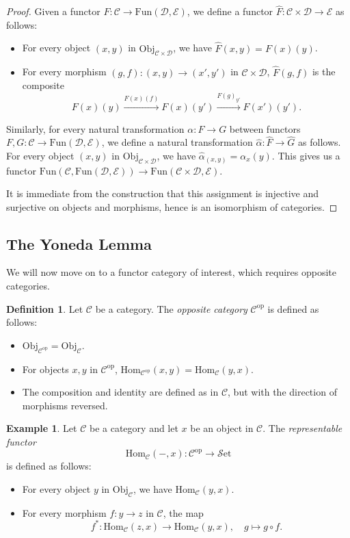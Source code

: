 \documentclass[11pt, a4paper]{amsart}
\newcommand{\cC}{\mathcal{C}}
\newcommand{\cD}{\mathcal{D}}
\newcommand{\cE}{\mathcal{E}}
\newcommand{\Hom}{\mathrm{Hom}}
\newcommand{\op}{\mathrm{op}}
\newcommand{\Fun}{\mathrm{Fun}}
\newcommand{\Set}{\mathscr{S}\mathrm{et}}
\newcommand{\Obj}{\mathrm{Obj}}
\theoremstyle{definition}
\newtheorem{definition}[equation]{Definition}
\newtheorem{example}[equation]{Example}
\theoremstyle{remark}
\numberwithin{equation}{section}
\begin{document}
\begin{proof}
 Given a functor $F\colon \cC \to \Fun(\cD,\cE)$, we define a functor $\hat{F}\colon \cC \times \cD \to \cE$ as follows:
\begin{itemize}[leftmargin=*]
  \item For every object $(x,y)$ in $\Obj_{\cC \times \cD}$, we have $\hat{F}(x,y) = F(x)(y)$.
  \item For every morphism $(g,f)\colon (x,y) \to (x',y')$ in $\cC \times \cD$, $\hat{F}(g,f)$ is the composite
  \[
    F(x)(y) \xrightarrow{F(x)(f)} F(x)(y') \xrightarrow{F(g)_{y'}} F(x')(y').
  \]
\end{itemize}
Similarly, for every natural transformation $\alpha\colon F \to G$ between functors $F,G\colon \cC \to \Fun(\cD,\cE)$, we define a natural transformation $\hat{\alpha}\colon \hat{F} \to \hat{G}$ as follows. For every object $(x,y)$ in $\Obj_{\cC \times \cD}$, we have $\hat{\alpha}_{(x,y)} = \alpha_x(y)$. This gives us a functor $\Fun(\cC, \Fun(\cD,\cE)) \to \Fun(\cC \times \cD, \cE)$.

It is immediate from the construction that this assignment is injective and surjective on objects and morphisms, hence is an isomorphism of categories.
\end{proof}

\subsection{The Yoneda Lemma}
We will now move on to a functor category of interest, which requires opposite categories. 

\begin{definition}
	Let $\cC$ be a category. The \emph{opposite category} $\cC^{\op}$ is defined as follows:
	\begin{itemize}
		\item $\Obj_{\cC^{\op}} = \Obj_{\cC}$.
		\item For objects $x,y$ in $\cC^{\op}$, $\Hom_{\cC^{\op}}(x,y) = \Hom_{\cC}(y,x)$.
		\item The composition and identity are defined as in $\cC$, but with the direction of morphisms reversed.
	\end{itemize}
\end{definition}

\begin{example} \label{ex:repcontra}
  Let $\cC$ be a category and let $x$ be an object in $\cC$. The \emph{representable functor} 
  \[\Hom_{\cC}(-,x)\colon \cC^{\op} \to \Set\] 
  is defined as follows:
  \begin{itemize}
    \item For every object $y$ in $\Obj_{\cC}$, we have $\Hom_{\cC}(y,x)$.
    \item For every morphism $f\colon y \to z$ in $\cC$, the map 
    \[
    f^*\colon \Hom_{\cC}(z,x) \to \Hom_{\cC}(y,x), \quad g \mapsto g \circ f.
    \]
  \end{itemize}
\end{example}
\end{document}
